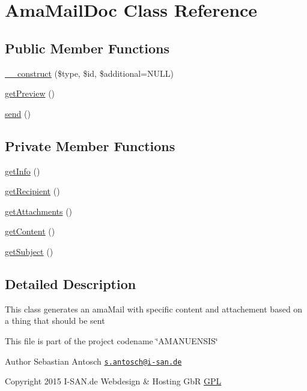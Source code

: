 \hypertarget{class_ama_mail_doc}{}\section{Ama\+Mail\+Doc Class Reference}
\label{class_ama_mail_doc}
\subsection*{Public Member Functions}
\begin{DoxyCompactItemize}
\item 
\hyperlink{class_ama_mail_doc_ab3a7841df012540f33bfd8c277801e2d}{\+\_\+\+\_\+construct} (\$type, \$id, \$additional=N\+U\+L\+L)
\item 
\hyperlink{class_ama_mail_doc_ab858356a1ff88c3d4efe48f1bf3a9028}{get\+Preview} ()
\item 
\hyperlink{class_ama_mail_doc_a12bcef5130168b80d3d52dc82213f19a}{send} ()
\end{DoxyCompactItemize}
\subsection*{Private Member Functions}
\begin{DoxyCompactItemize}
\item 
\hyperlink{class_ama_mail_doc_a164026f74736817927e1cacd282a2e28}{get\+Info} ()
\item 
\hyperlink{class_ama_mail_doc_a14ad3e290231897f1be73086b9912fbc}{get\+Recipient} ()
\item 
\hyperlink{class_ama_mail_doc_aa91862c4e237ee5b53083f41633babb6}{get\+Attachments} ()
\item 
\hyperlink{class_ama_mail_doc_a58e43f09a06ce4e29b192c4e17ce7915}{get\+Content} ()
\item 
\hyperlink{class_ama_mail_doc_a7ec8f5b794ded8f3c0df9afd96c8233c}{get\+Subject} ()
\end{DoxyCompactItemize}


\subsection{Detailed Description}
This class generates an ama\+Mail with specific content and attachement based on a thing that should be sent

This file is part of the project codename \char`\"{}\+A\+M\+A\+N\+U\+E\+N\+S\+I\+S\char`\"{}

\begin{DoxyAuthor}{Author}
Sebastian Antosch \href{mailto:s.antosch@i-san.de}{\tt s.\+antosch@i-\/san.\+de} 
\end{DoxyAuthor}
\begin{DoxyCopyright}{Copyright}
2015 I-\/\+S\+A\+N.\+de Webdesign \& Hosting Gb\+R \hyperlink{}{G\+P\+L }
\end{DoxyCopyright}



